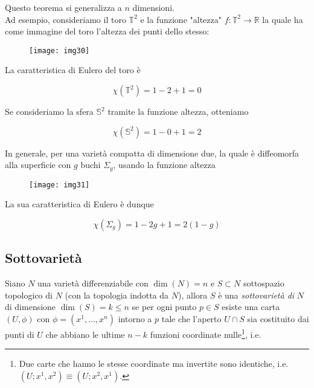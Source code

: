 Questo teorema si generalizza a $ n $ dimensioni.\\
Ad esempio, consideriamo il toro $ \mathbb{T}^{2} $ e la funzione "altezza" $ f : \mathbb{T}^{2} \to \mathbb{R} $ la quale ha come immagine del toro l'altezza dei punti dello stesso:

\begin{figure}[H]
	\centering
	\texttt{[image: img30]}
\end{figure}

La caratteristica di Eulero del toro è

\begin{equation}
	\chi(\mathbb{T}^{2}) = 1-2+1 = 0
\end{equation}

Se consideriamo la sfera $ \mathbb{S}^{2} $ tramite la funzione altezza, otteniamo

\begin{equation}
	\chi(\mathbb{S}^{2}) = 1-0+1 = 2
\end{equation}

In generale, per una varietà compatta di dimensione due, la quale è diffeomorfa alla superficie con $ g $ buchi $ \Sigma_{g} $, usando la funzione altezza

\begin{figure}[H]
	\centering
	\texttt{[image: img31]}
\end{figure}

La sua caratteristica di Eulero è dunque

\begin{equation}
	\chi(\Sigma_{g}) = 1-2g+1 = 2 (1-g)
\end{equation}

\subsection{Sottovarietà}

Siano $ N $ una varietà differenziabile con $ \dim(N)=n $ e $ S \subset N $ sottospazio topologico di $ N $ (con la topologia indotta da $ N $), allora $ S $ è una \textit{sottovarietà di} $ N $ di dimensione $ \dim(S) = k \leqslant n $ se per ogni punto $ p \in S $ esiste una carta $ (U,\phi) $ con $ \phi = (x^{1},\dots,x^{n}) $ intorno a $ p $ tale che l'aperto $ U \cap S $ sia costituito dai punti di $ U $ che abbiano le ultime $ n-k $ funzioni coordinate nulle\footnote{%
	Due carte che hanno le stesse coordinate ma invertite sono identiche, i.e. $ (U;x^{1},x^{2}) \equiv (U;x^{2},x^{1}) $.%
}, i.e.

